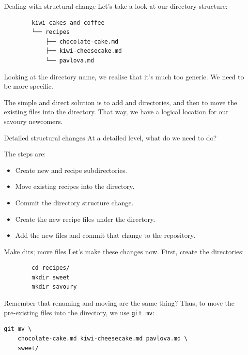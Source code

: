 \documentclass{git_course}
\begin{document}
\begin{frame}[fragile]{Dealing with structural change}
    Let's take a look at our directory structure:
    \begin{verbatim}
        kiwi-cakes-and-coffee
        └── recipes
            ├── chocolate-cake.md
            ├── kiwi-cheesecake.md
            └── pavlova.md
    \end{verbatim}
    Looking at the  directory name, we realise that it's much
    too generic.  We need to be more specific.

    The simple and direct solution is to add  and
     directories, and then to move the existing files into
    the  directory.  That way, we have a logical location for
    our savoury newcomers.
\end{frame}

\begin{frame}[fragile]{Detailed structural changes}
    At a detailed level, what do we need to do?

    The steps are:
    \begin{itemize}
        \item Create new  and  recipe
            subdirectories.
        \item Move existing recipes into the 
            directory.
        \item Commit the directory structure change.
        \item Create the new recipe files under the 
            directory.
        \item Add the new files and commit that change to the repository.
    \end{itemize}
\end{frame}

\begin{frame}[fragile]{Make dirs; move files}
    Let's make these changes now.  First, create the directories:
    \begin{verbatim}
        cd recipes/
        mkdir sweet
        mkdir savoury
    \end{verbatim}

    Remember that renaming and moving are the same thing?  Thus, to move the
    pre-existing files into the  directory, we use
    \texttt{git mv}:
    \begin{verbatim}
git mv \
    chocolate-cake.md kiwi-cheesecake.md pavlova.md \
    sweet/
    \end{verbatim}
\end{frame}
\end{document}
